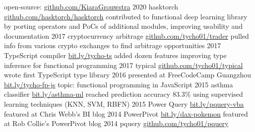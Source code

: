 \documentclass[]{friggeri-cv}
\begin{document}
\begin{entrylist}
\entry
    {}
    {open-source: }
    {\href{https://www.github.com/KiaraGrouwstra}{github.com/KiaraGrouwstra}}
    {}
  \entry
    {2020}
    {hasktorch}
    {\href{https://github.com/hasktorch/hasktorch}{github.com/hasktorch/hasktorch}}
    {
      contributed to functional deep learning library by porting operators and PoCs of additional modules, improving usability and documentation
    }
  \entry
    {2017}
    {cryptocurrency arbitrage}
    {\href{https://github.com/KiaraGrouwstra/trader}{github.com/tycho01/trader}}
    {
      pulled info from various crypto exchanges to find arbitrage opportunities
    }
  \entry
    {2017}
    {TypeScript compiler}
    {\href{https://github.com/Microsoft/TypeScript/pulls/KiaraGrouwstra}{bit.ly/tycho-ts}}
    {
      added dozen features improving type inference for functional programming
    }
  \entry
    {2017}
    {typical}
    {\href{https://github.com/KiaraGrouwstra/typical}{github.com/tycho01/typical}}
    {
      wrote first TypeScript type library
    }
  \entry
    {2016}
    {
      presented at
      FreeCodeCamp Guangzhou
    }
    {\href{https://www.slideshare.net/TychoGrouwstra/fp-in-js}{bit.ly/tycho-fp-js}}
    {topic: functional programming in JavaScript}
  \entry
    {2015}
    {
      asthma
      classifier
      \normalfont{}
    }
    {\href{http://bit.ly/asthma-ml}{bit.ly/asthma-ml}}
    {
      reached prediction accuracy 83.3\% using supervised learning techniques (KNN, SVM, RBFN)
    }
  \entry
    {2015}
    {
      Power Query 
    }
    {\href{https://blog.crossjoin.co.uk/2015/06/10/power-queryexcel-2016-vba-examples/}{bit.ly/pquery-vba}}
    {
      featured at
      Chris Webb's BI blog
    }
  \entry
    {2014}
    {
      PowerPivot 
    }
    {\href{https://powerpivotpro.com/2014/02/optimal-set-selection-power-pivot-does-pokemon-and-my-brain-just-exploded/}{bit.ly/dax-pokemon}}
    {
      featured at
      Rob Collie's PowerPivot blog
    }
  \entry
    {2014}
    {pquery}
    {\href{https://github.com/KiaraGrouwstra/pquery}{github.com/tycho01/pquery}}

\end{entrylist}
\end{document}
